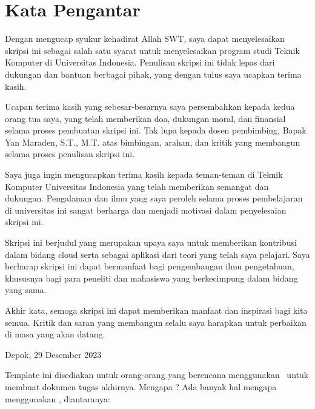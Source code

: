 \chapter*{Kata Pengantar}
Dengan mengucap syukur kehadirat Allah SWT, saya dapat menyelesaikan skripsi ini sebagai salah satu syarat untuk menyelesaikan program studi Teknik Komputer di Universitas Indonesia. Penulisan skripsi ini tidak lepas dari dukungan dan bantuan berbagai pihak, yang dengan tulus saya ucapkan terima kasih.

Ucapan terima kasih yang sebesar-besarnya saya persembahkan kepada kedua orang tua saya, yang telah memberikan doa, dukungan moral, dan finansial selama proses pembuatan skripsi ini. Tak lupa kepada dosen pembimbing, Bapak Yan Maraden, S.T., M.T. atas bimbingan, arahan, dan kritik yang membangun selama proses penulisan skripsi ini.

Saya juga ingin mengucapkan terima kasih kepada teman-teman di Teknik Komputer Universitas Indonesia yang telah memberikan semangat dan dukungan. Pengalaman dan ilmu yang saya peroleh selama proses pembelajaran di universitas ini sangat berharga dan menjadi motivasi dalam penyelesaian skripsi ini.

Skripsi ini berjudul \judul yang merupakan upaya saya untuk memberikan kontribusi dalam bidang cloud serta sebagai aplikasi dari teori yang telah saya pelajari. Saya berharap skripsi ini dapat bermanfaat bagi pengembangan ilmu pengetahuan, khususnya bagi para peneliti dan mahasiswa yang berkecimpung dalam bidang yang sama.

Akhir kata, semoga skripsi ini dapat memberikan manfaat dan inspirasi bagi kita semua. Kritik dan saran yang membangun selalu saya harapkan untuk perbaikan di masa yang akan datang.


\vspace*{0.1cm}
\begin{flushright}
	Depok, 29 Desember 2023\\[0.1cm]
	\vspace*{1cm}
	\penulis
	
\end{flushright}
	
\iffalse
Template ini disediakan untuk orang-orang yang berencana menggunakan 
\latex~untuk membuat dokumen tugas akhirnya. 
Mengapa \latex? 
Ada banyak hal mengapa menggunakan \latex, diantaranya:

